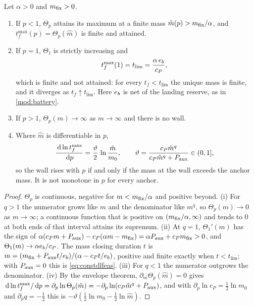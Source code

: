 \begin{proposition}
\label{prop:twall}
Let $\alpha>0$ and $m_{\mathrm{fix}}>0$.
\begin{enumerate}[label=(\roman*),nosep]
  \item If $p<1$, $\Theta_p$ attains its maximum at a finite mass
        $\hat m(p) > m_{\mathrm{fix}}/\alpha$, and $t_f^{\max}(p)=\Theta_p(\hat m)$ is
        finite and attained.
  \item If $p=1$, $\Theta_1$ is strictly increasing and
        \begin{equation}
          t_f^{\max}(1) = t_{\lim} = \frac{\alpha\,e_b}{c_P} ,
          \label{eq:tlim}
        \end{equation}
        which is finite and not attained: for every $t_f<t_{\lim}$ the unique
        mass is finite, and it diverges as $t_f\uparrow t_{\lim}$. Here $e_b$
        is net of the landing reserve, as in \cref{mod:battery}.
  \item If $p>1$, $\Theta_p(m)\to\infty$ as $m\to\infty$ and there is no wall.
  \item Where $\hat m$ is differentiable in $p$,
        \begin{equation}
          \frac{\,\mathrm{d}\ln t_f^{\max}}{\,\mathrm{d} p}
          = \frac{\vartheta}{2}\,\ln\frac{\hat m}{m_0} ,
          \qquad
          \vartheta = \frac{c_P\hat m^{q}}{c_P \hat m^{q}+P_{\mathrm{aux}}}\in(0,1],
          \label{eq:wallslope}
        \end{equation}
        so the wall rises with $p$ if and only if the mass at the wall exceeds
        the anchor mass. It is not monotone in $p$ for every anchor.
\end{enumerate}
\end{proposition}

\begin{proof}
$\Theta_p$ is continuous, negative for $m<m_{\mathrm{fix}}/\alpha$ and positive beyond.
(i) For $q>1$ the numerator grows like $m$ and the denominator like $m^q$, so
$\Theta_p(m)\to0$ as $m\to\infty$; a continuous function that is positive on
$(m_{\mathrm{fix}}/\alpha,\infty)$ and tends to $0$ at both ends of that interval attains
its supremum. (ii) At $q=1$,
$\Theta_1'(m)$ has the sign of
$\alpha(c_P m+P_{\mathrm{aux}}) - c_P(\alpha m-m_{\mathrm{fix}}) = \alpha P_{\mathrm{aux}} + c_Pm_{\mathrm{fix}}>0$, and
$\Theta_1(m)\to\alpha e_b/c_P$. The mass closing duration $t$ is
$m = (m_{\mathrm{fix}} + P_{\mathrm{aux}} t/e_b)/(\alpha - c_P t/e_b)$, positive and finite exactly
when $t<t_{\lim}$; with $P_{\mathrm{aux}}=0$ this is \cref{eq:constdlfeas}. (iii) For
$q<1$ the numerator outgrows the denominator. (iv) By the envelope theorem,
$\partial_m\Theta_p(\hat m)=0$ gives
$\,\mathrm{d}\ln t_f^{\max}/\,\mathrm{d} p = \partial_p\ln\Theta_p(\hat m)
= -\partial_p \ln(c_P \hat m^q + P_{\mathrm{aux}})$, and with
$\partial_p\ln c_P = \tfrac12\ln m_0$ and $\partial_p q = -\tfrac12$ this is
$-\vartheta(\tfrac12\ln m_0 - \tfrac12\ln\hat m)$.
\end{proof}

